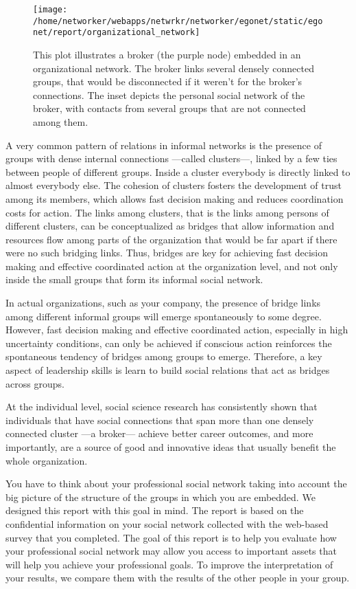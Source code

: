 \documentclass[a4paper,12pt]{article}
\begin{document}
\begin{figure}[H]
\centering
\texttt{[image: /home/networker/webapps/netwrkr/networker/egonet/static/egonet/report/organizational\_network]}
\caption{This plot illustrates a broker (the purple node) embedded in an organizational network. The broker links several densely connected groups, that would be disconnected if it weren't for the broker's connections. The inset depicts the personal social network of the broker, with contacts from several groups that are not connected among them.}
\end{figure}


A very common pattern of relations in informal networks is the presence of groups with dense internal connections ---called clusters---, linked by a few ties between people of different groups. Inside a cluster everybody is directly linked to almost everybody else. The cohesion of clusters fosters the development of trust among its members, which allows fast decision making and reduces coordination costs for action. The links among clusters, that is the links among persons of different clusters, can be conceptualized as bridges that allow information and resources flow among parts of the organization that would be far apart if there were no such bridging links. Thus, bridges are key for achieving fast decision making and effective coordinated action at the organization level, and not only inside the small groups that form its informal social network.

In actual organizations, such as your company, the presence of bridge links among different informal groups will emerge spontaneously to some degree. However, fast decision making and effective coordinated action, especially in high uncertainty conditions, can only be achieved if conscious action reinforces the spontaneous tendency of bridges among groups to emerge. Therefore, a key aspect of leadership skills is learn to build social relations that act as bridges across groups.

At the individual level, social science research has consistently shown that individuals that have social connections that span more than one densely connected cluster ---a broker--- achieve better career outcomes, and more importantly, are a source of good and innovative ideas that usually benefit the whole organization.

You have to think about your professional social network taking into account the big picture of the structure of the groups in which you are embedded. We designed this report with this goal in mind. The report is based on the confidential information on your social network collected with the web-based survey that you completed. The goal of this report is to help you evaluate how your professional social network may allow you access to important assets that will help you achieve your professional goals. To improve the interpretation of your results, we compare them with the results of the other people in your group.
\end{document}
